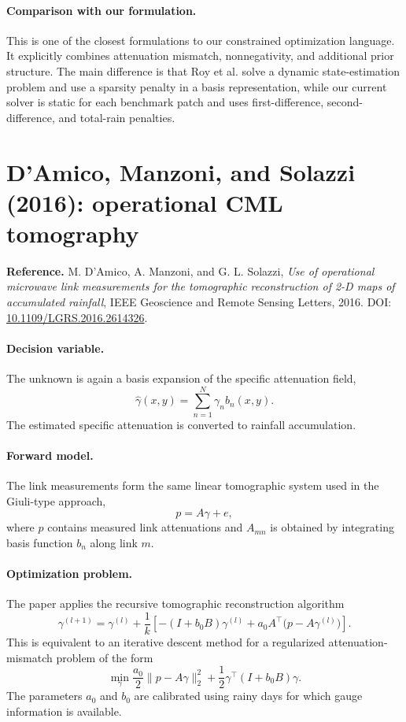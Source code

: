 \documentclass[11pt]{article}
\begin{document}
\paragraph{Comparison with our formulation.}
This is one of the closest formulations to our constrained optimization language.
It explicitly combines attenuation mismatch, nonnegativity, and additional prior structure.
The main difference is that Roy et al. solve a dynamic state-estimation problem and use a sparsity penalty in a basis representation, while our current solver is static for each benchmark patch and uses first-difference, second-difference, and total-rain penalties.

\section{D'Amico, Manzoni, and Solazzi (2016): operational CML tomography}
\textbf{Reference.}
M. D'Amico, A. Manzoni, and G. L. Solazzi,
\emph{Use of operational microwave link measurements for the tomographic reconstruction of 2-D maps of accumulated rainfall},
IEEE Geoscience and Remote Sensing Letters, 2016.
DOI: \href{https://doi.org/10.1109/LGRS.2016.2614326}{10.1109/LGRS.2016.2614326}.

\paragraph{Decision variable.}
The unknown is again a basis expansion of the specific attenuation field,
\[
  \hat{\gamma}(x,y)=\sum_{n=1}^N \gamma_n b_n(x,y).
\]
The estimated specific attenuation is converted to rainfall accumulation.

\paragraph{Forward model.}
The link measurements form the same linear tomographic system used in the Giuli-type approach,
\[
  p=A\gamma+e,
\]
where $p$ contains measured link attenuations and $A_{mn}$ is obtained by integrating basis function $b_n$ along link $m$.

\paragraph{Optimization problem.}
The paper applies the recursive tomographic reconstruction algorithm
\[
  \gamma^{(l+1)}
  =
  \gamma^{(l)}
  +
  \frac{1}{k}
  \left[-(I+b_0B)\gamma^{(l)} + a_0A^\top\bigl(p-A\gamma^{(l)}\bigr)\right].
\]
This is equivalent to an iterative descent method for a regularized attenuation-mismatch problem of the form
\[
  \min_\gamma
  \frac{a_0}{2}\|p-A\gamma\|_2^2
  +
  \frac{1}{2}\gamma^\top(I+b_0B)\gamma .
\]
The parameters $a_0$ and $b_0$ are calibrated using rainy days for which gauge information is available.
\end{document}
